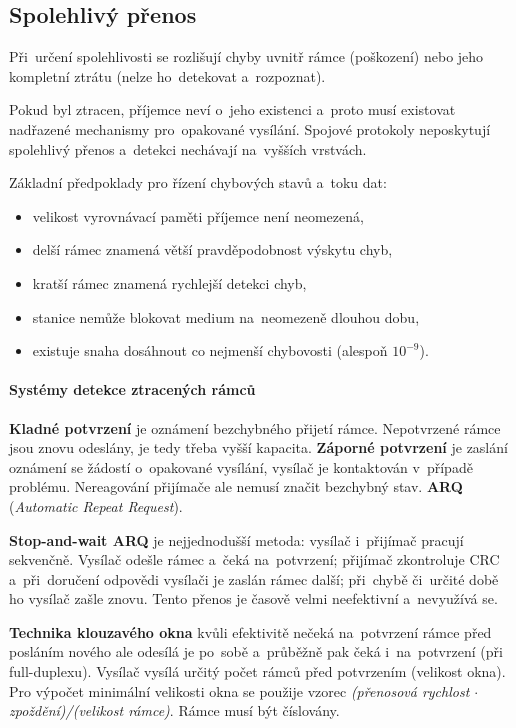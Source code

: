 \subsection{Spolehlivý přenos}

Při~určení spolehlivosti se rozlišují chyby uvnitř rámce (poškození) nebo jeho kompletní ztrátu (nelze ho~detekovat a~rozpoznat).

Pokud byl ztracen, příjemce neví o~jeho existenci a~proto musí existovat nadřazené mechanismy pro~opakované vysílání. Spojové protokoly neposkytují spolehlivý přenos a~detekci nechávají na~vyšších vrstvách.

Základní předpoklady pro řízení chybových stavů a~toku dat:

\begin{itemize}[noitemsep]
    \item velikost vyrovnávací paměti příjemce není neomezená,
    \item delší rámec znamená větší pravděpodobnost výskytu chyb,
    \item kratší rámec znamená rychlejší detekci chyb,
    \item stanice nemůže blokovat medium na~neomezeně dlouhou dobu,
    \item existuje snaha dosáhnout co nejmenší chybovosti (alespoň $10^{-9}$).
\end{itemize}

\paragraph{Systémy detekce ztracených rámců} \textbf{Kladné potvrzení} je oznámení bezchybného přijetí rámce. Nepotvrzené rámce jsou znovu odeslány, je tedy třeba vyšší kapacita. \textbf{Záporné potvrzení} je zaslání oznámení se žádostí o~opakované vysílání, vysílač je kontaktován v~případě problému. Nereagování přijímače ale nemusí značit bezchybný stav. \textbf{ARQ} (\emph{Automatic Repeat Request}).

\textbf{Stop-and-wait ARQ} je nejjednodušší metoda: vysílač i~přijímač pracují sekvenčně. Vysílač odešle rámec a~čeká na~potvrzení; přijímač zkontroluje CRC a~při~doručení odpovědi vysílači je zaslán rámec další; při~chybě či~určité době ho vysílač zašle znovu. Tento přenos je časově velmi neefektivní a~nevyužívá se.

\textbf{Technika klouzavého okna} kvůli efektivitě nečeká na~potvrzení rámce před posláním nového ale odesílá je po~sobě a~průběžně pak čeká i~na~potvrzení (při full-duplexu). Vysílač vysílá určitý počet rámců před potvrzením (velikost okna). Pro výpočet minimální velikosti okna se použije vzorec \emph{(přenosová rychlost $\cdot$ zpoždění)/(velikost rámce)}. Rámce musí být číslovány.

